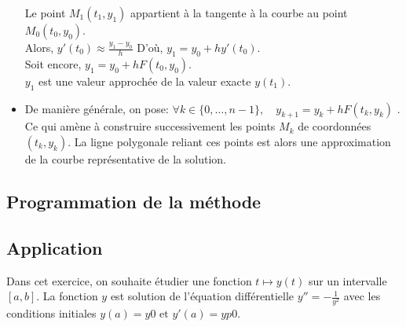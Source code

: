\begin{itemize}
\begin{minipage}{0.5\linewidth}
		Le point $M_1(t_1,y_1)$ appartient à la tangente à la courbe au point $M_0(t_0,y_0)$.\\
		Alors,   {$y'(t_0) \approx \displaystyle\frac{y_1-y_0}{h}$}
		D'où, $y_1=y_0+hy'(t_0)$.\\
		Soit encore,   {$y_1=y_0+hF(t_0,y_0)$.}\\
		$y_1$ est une valeur approchée de la valeur exacte $y(t_1)$.
		
	\end{minipage}
	
	
	
	\item De manière générale, on pose:
$\forall k\in\{0,\dots,n-1\},\quad  y_{k+1}=y_k+hF(t_k,y_k)$
. %
	Ce qui amène à construire successivement les points $M_k$ de coordonnées $(t_k,y_k)$. La ligne polygonale reliant ces points est alors une approximation de la courbe représentative de la solution.
\end{itemize}

\subsection{Programmation de la méthode }

	

\subsection{Application}

Dans cet exercice, on souhaite étudier une fonction $t\mapsto y(t)$ sur un intervalle $[a,b]$. La fonction $y$ est solution de l'équation différentielle $y''=-\displaystyle\frac 1{y^2}$ avec les conditions initiales $y(a)=y0 \textrm{ et } y'(a)=yp0.$

